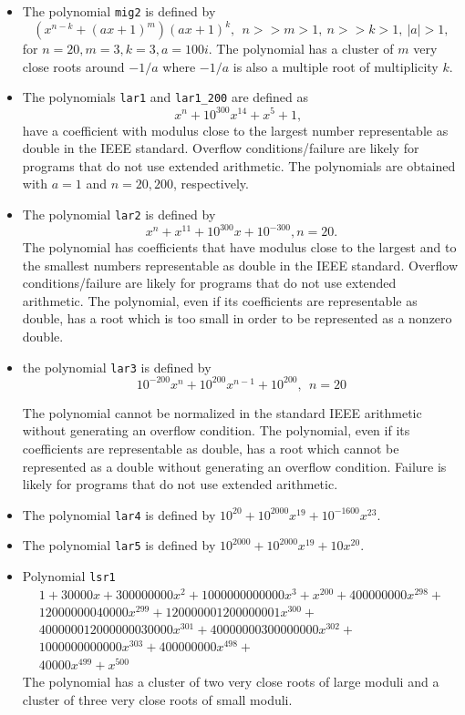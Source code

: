 \documentclass{article}
\begin{document}
\begin{itemize}
\item
The polynomial {\tt mig2} is defined by
\[
(x^{n-k}+(a x+1)^m)(a x+1)^k, \ \ n>>m>1, \ n>>k>1,\ |a|>1,
\]
for $ n=20, m=3, k=3, a=100 i$. 
The polynomial has a cluster of $m$ very close roots around $-1/a$
where $-1/a$ is also a multiple root of multiplicity $k$.

\item The polynomials {\tt lar1} and {\tt lar1\_200} are defined as 
\[
x^{n}+10^{300}x^{14}+x^5+1, \ \ 
\]
have a coefficient with modulus close to the largest number
representable as double in the IEEE standard.  Overflow
conditions/failure are likely for programs that do not use extended
arithmetic.  The polynomials are obtained with $a=1$ and $n=20,200$,
respectively.

\item The polynomial {\tt lar2} is defined by
\[
  x^{n}+x^{11}+10^{300}x+10^{-300},  n=20.
\]
The polynomial has coefficients that have modulus close to the largest
and to the smallest numbers representable as double in the IEEE
standard.  Overflow conditions/failure are likely for programs that do
not use extended arithmetic.  The polynomial, even if its coefficients
are representable as double, has a root which is too small in order to
be represented as a nonzero double.
\item the polynomial {\tt lar3} is defined by
\[
 10^{-200} x^{n}+10^{200} x^{n-1}+10^{200},  \ \  n=20
\]

The polynomial cannot be normalized in the standard IEEE arithmetic
without generating an overflow condition.  The polynomial, even if its
coefficients are representable as double, has a root which cannot be
represented as a double without generating an overflow condition.
Failure is likely for programs that do not use extended arithmetic.

\item The polynomial {\tt lar4} is defined by 
$
10^{20}+10^{2000} x^{19} +
10^{-1600} x^{23}
$.

\item The polynomial {\tt lar5} is defined by 
$
10^{2000} 
+
10^{2000} x^{19}
+
10 x^{20}
$.

\item Polynomial {\tt lsr1}
\[
\begin{array}{l}
1 + 30000x + 300000000x^2 + 1000000000000x^3 + x^{200} + 400000000
  x^{298} + \\ 12000000040000 x^{299} + 120000001200000001 x^{300} +
  \\ 400000012000000030000 x^{301} + 40000000300000000 x^{302} + \\
  1000000000000 x^{303} + 400000000 x^{498} + \\ 40000 x^{499 }+
  x^{500}
\end{array}
\]
The polynomial has a cluster of two very close roots of large moduli
and a cluster of three very close roots of small moduli.


\end{itemize}
\end{document}
